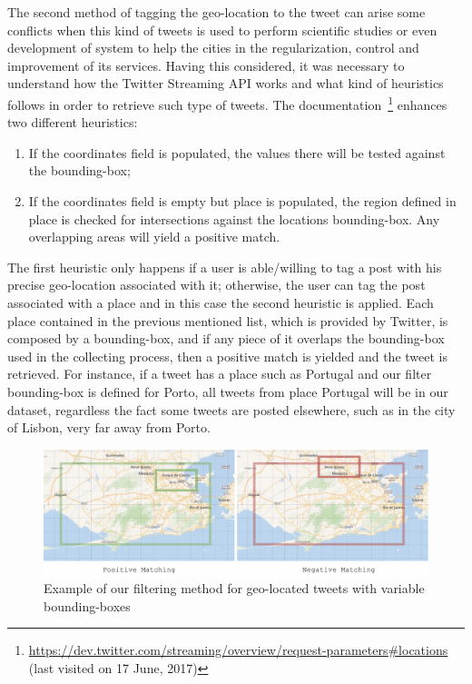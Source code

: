 The second method of tagging the geo-location to the tweet can arise some conflicts when this kind of tweets is used to perform scientific studies or even development of system to help the cities in the regularization, control and improvement of its services. Having this considered, it was necessary to understand how the Twitter Streaming \gls{API} works and what kind of heuristics follows in order to retrieve such type of tweets. The documentation~\footnote{\url{https://dev.twitter.com/streaming/overview/request-parameters\#locations} (last visited on 17 June, 2017)} enhances two different heuristics:

\begin{enumerate}
	\item If the coordinates field is populated, the values there will be tested against the bounding-box;
	\item If the coordinates field is empty but place is populated, the region defined in place is checked for intersections against the locations bounding-box. Any overlapping areas will yield a positive match.
	\end{enumerate}
	
The first heuristic only happens if a user is able/willing to tag a post with his precise geo-location associated with it; otherwise, the user can tag the post associated with a place and in this case the second heuristic is applied. Each place contained in the previous mentioned list, which is provided by Twitter, is composed by a bounding-box, and if any piece of it overlaps the bounding-box used in the collecting process, then a positive match is yielded and the tweet is retrieved. For instance, if a tweet has a place such as Portugal and our filter bounding-box is defined for Porto, all tweets from place Portugal will be in our dataset, regardless the fact some tweets are posted elsewhere, such as in the city of Lisbon, very far away from Porto.

\begin{figure}[!htbp]
	\centering
	\includegraphics[width=\textwidth]{figures/bounding_boxes_matching.pdf}
	\caption{Example of our filtering method for geo-located tweets with variable bounding-boxes}
	\label{fig:matching_example}
\end{figure}

